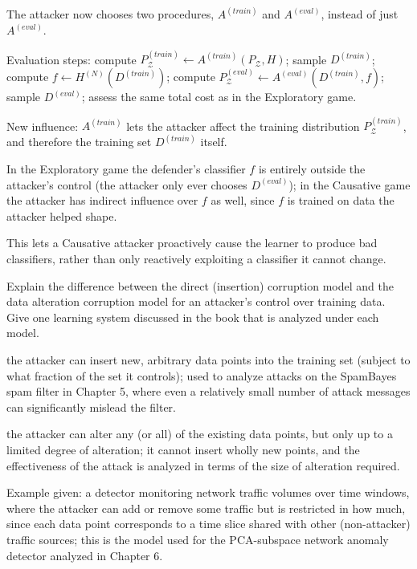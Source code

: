 \documentclass[10pt]{extarticle}
\newcommand{\resposta}[1]{\par\smallskip\noindent #1}
\begin{document}
\begin{questoes}
\resposta{
\begin{topicos}
\item The attacker now chooses two procedures, $A^{(train)}$ and $A^{(eval)}$, instead of just $A^{(eval)}$.
\item Evaluation steps: compute $P_{\mathcal{Z}}^{(train)} \leftarrow A^{(train)}(P_{\mathcal{Z}}, H)$; sample $D^{(train)}$; compute $f \leftarrow H^{(N)}(D^{(train)})$; compute $P_{\mathcal{Z}}^{(eval)} \leftarrow A^{(eval)}(D^{(train)}, f)$; sample $D^{(eval)}$; assess the same total cost as in the Exploratory game.
\item New influence: $A^{(train)}$ lets the attacker affect the training distribution $P_{\mathcal{Z}}^{(train)}$, and therefore the training set $D^{(train)}$ itself.
\item In the Exploratory game the defender's classifier $f$ is entirely outside the attacker's control (the attacker only ever chooses $D^{(eval)}$); in the Causative game the attacker has indirect influence over $f$ as well, since $f$ is trained on data the attacker helped shape.
\item This lets a Causative attacker proactively cause the learner to produce bad classifiers, rather than only reactively exploiting a classifier it cannot change.
\end{topicos}
}

\item Explain the difference between the direct (insertion) corruption model and the data alteration corruption model for an attacker's control over training data. Give one learning system discussed in the book that is analyzed under each model.

\resposta{
\begin{topicos}
\item[Direct (insertion) model:] the attacker can insert new, arbitrary data points into the training set (subject to what fraction of the set it controls); used to analyze attacks on the SpamBayes spam filter in Chapter 5, where even a relatively small number of attack messages can significantly mislead the filter.
\item[Data alteration model:] the attacker can alter any (or all) of the existing data points, but only up to a limited degree of alteration; it cannot insert wholly new points, and the effectiveness of the attack is analyzed in terms of the size of alteration required.
\item Example given: a detector monitoring network traffic volumes over time windows, where the attacker can add or remove some traffic but is restricted in how much, since each data point corresponds to a time slice shared with other (non-attacker) traffic sources; this is the model used for the PCA-subspace network anomaly detector analyzed in Chapter 6.
\end{topicos}
}


\end{questoes}
\end{document}
